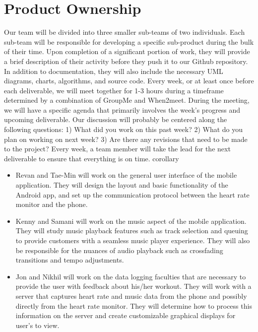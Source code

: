 \documentclass[letterpaper,english, 12pt]{scrreprt}
\begin{document}
\section{Product Ownership}
Our team will be divided into three smaller sub-teams of two individuals. Each sub-team will be responsible for developing a specific sub-product during the bulk of their time. Upon completion of a significant portion of work, they will provide a brief description of their activity before they push it to our Github repository. In addition to documentation, they will also include the necessary UML diagrams, charts, algorithms, and source code. Every week, or at least once before each deliverable, we will meet together for 1-3 hours during a timeframe determined by a combination of GroupMe and When2meet. During the meeting, we will have a specific agenda that primarily involves the week's progress and upcoming deliverable. Our discussion will probably be centered along the following questions: 1) What did you work on this past week? 2) What do you plan on working on next week? 3) Are there any revisions that need to be made to the project? Every week, a team member will take the lead for the next deliverable to ensure that everything is on time.
corollary
\begin{itemize}
    \item Revan and Tae-Min will work on the general user interface of the mobile application. They will design the layout and basic functionality of the Android app, and set up the communication protocol between the heart rate monitor and the phone. 
    \item Kenny and Samani will work on the music aspect of the mobile application. They will study music playback features such as track selection and queuing to provide customers with a seamless music player experience. They will also be responsible for the nuances of audio playback such as crossfading transitions and tempo adjustments.
    \item Jon and Nikhil will work on the data logging faculties that are necessary to provide the user with feedback about his/her workout. They will work with a server that captures heart rate and music data from the phone and possibly directly from the heart rate monitor. They will determine how to process this information on the server and create customizable graphical displays for user's to view.
\end{itemize}
\end{document}

